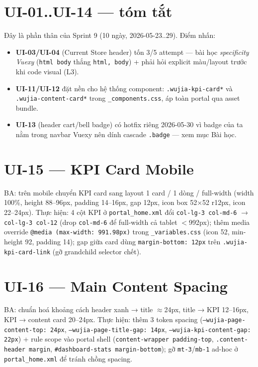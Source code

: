 \section{UI-01..UI-14 --- tóm tắt}

Đây là phần thân của Sprint 9 (10 ngày, 2026-05-23..29). Điểm nhấn:

\begin{itemize}[leftmargin=*]
    \item \textbf{UI-03/UI-04} (Current Store header) tốn 3/5 attempt --- bài học
          \emph{specificity Vuexy} (\texttt{html body} thắng \texttt{html, body}) +
          phải hỏi explicit màu/layout trước khi code visual (L3).
    \item \textbf{UI-11/UI-12} đặt nền cho hệ thống component: \texttt{.wujia-kpi-card*}
          và \texttt{.wujia-content-card*} trong \texttt{\_components.css}, áp toàn portal
          qua asset bundle.
    \item \textbf{UI-13} (header cart/bell badge) có hotfix riêng 2026-05-30 vì badge
          của ta nằm trong navbar Vuexy nên dính cascade \texttt{.badge} --- xem
          mục Bài học.
\end{itemize}

\section{UI-15 --- KPI Card Mobile}

BA: trên mobile chuyển KPI card sang layout 1 card / 1 dòng / full-width
(width 100\%, height 88--96px, padding 14--16px, gap 12px, icon box 52×52 r12px,
icon 22--24px). Thực hiện: 4 cột KPI ở \texttt{portal\_home.xml} đổi
\texttt{col-lg-3 col-md-6} \(\rightarrow\) \texttt{col-lg-3 col-12} (drop \texttt{col-md-6}
để full-width cả tablet \(<\)992px); thêm media override
\texttt{@media (max-width: 991.98px)} trong \texttt{\_variables.css} (icon 52,
min-height 92, padding 14); gap giữa card dùng \texttt{margin-bottom: 12px} trên
\texttt{.wujia-kpi-card-link} (gỡ grandchild selector chết).

\section{UI-16 --- Main Content Spacing}

BA: chuẩn hoá khoảng cách header xanh → title \(\approx\)24px, title → KPI
12--16px, KPI → content card 20--24px. Thực hiện: thêm 3 token spacing
(\texttt{--wujia-page-content-top: 24px}, \texttt{--wujia-page-title-gap: 14px},
\texttt{--wujia-kpi-content-gap: 22px}) + rule scope vào portal shell
(\texttt{content-wrapper padding-top}, \texttt{.content-header margin},
\texttt{\#dashboard-stats margin-bottom}); gỡ \texttt{mt-3}/\texttt{mb-1} ad-hoc ở
\texttt{portal\_home.xml} để tránh chồng spacing.


